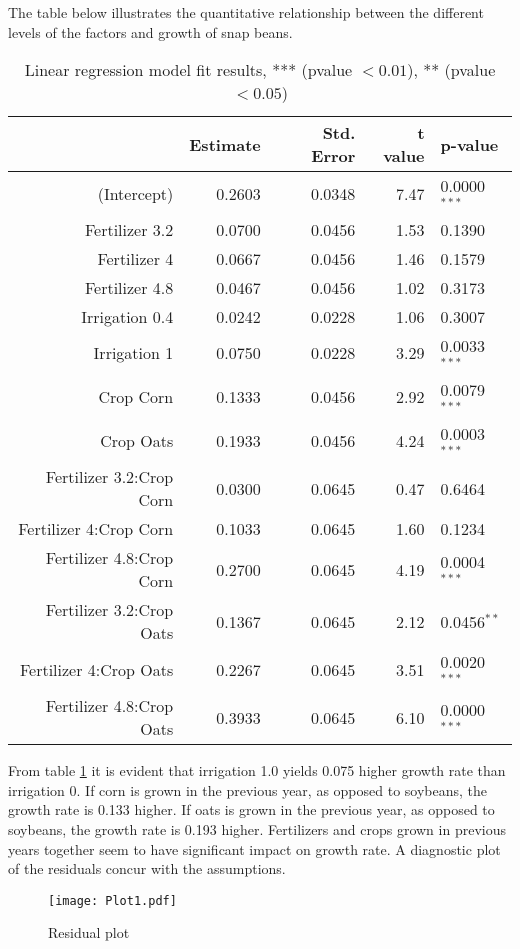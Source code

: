 \documentclass[11pt,a4paper]{article}
\begin{document}
The table below illustrates the quantitative relationship between the different levels of the factors and growth of snap beans. 
\begin{table}[H]
\centering
\begin{tabular}{rrrrl}
  \hline
 & Estimate & Std. Error & t value & p-value \\ 
  \hline
  (Intercept) & 0.2603 & 0.0348 & 7.47 & 0.0000$^{***}$ \\ 
  Fertilizer 3.2 & 0.0700 & 0.0456 & 1.53 & 0.1390 \\ 
  Fertilizer 4 & 0.0667 & 0.0456 & 1.46 & 0.1579 \\ 
  Fertilizer 4.8 & 0.0467 & 0.0456 & 1.02 & 0.3173 \\ 
  Irrigation 0.4 & 0.0242 & 0.0228 & 1.06 & 0.3007 \\ 
  Irrigation 1 & 0.0750 & 0.0228 & 3.29 & 0.0033$^{***}$ \\ 
  Crop Corn & 0.1333 & 0.0456 & 2.92 & 0.0079$^{***}$ \\ 
  Crop Oats & 0.1933 & 0.0456 & 4.24 & 0.0003$^{***}$ \\ 
  Fertilizer 3.2:Crop Corn & 0.0300 & 0.0645 & 0.47 & 0.6464 \\ 
  Fertilizer 4:Crop Corn & 0.1033 & 0.0645 & 1.60 & 0.1234 \\ 
  Fertilizer 4.8:Crop Corn & 0.2700 & 0.0645 & 4.19 & 0.0004$^{***}$ \\ 
  Fertilizer 3.2:Crop Oats & 0.1367 & 0.0645 & 2.12 & 0.0456$^{**}$ \\ 
  Fertilizer 4:Crop Oats & 0.2267 & 0.0645 & 3.51 & 0.0020$^{***}$ \\ 
  Fertilizer 4.8:Crop Oats & 0.3933 & 0.0645 & 6.10 & 0.0000$^{***}$ \\ 
  \hline
\end{tabular}
\caption{Linear regression model fit results, *** (pvalue $< 0.01$), ** (pvalue $< 0.05$)}
\label{tab:Tab1_2}
\end{table}
From table \ref{tab:Tab1_2} it is evident that irrigation 1.0 yields 0.075 higher growth rate than irrigation 0. If corn is grown in the previous year, as opposed to soybeans, the growth rate is 0.133 higher. If oats is grown in the previous year, as opposed to soybeans, the growth rate is 0.193 higher. Fertilizers and crops grown in previous years together seem to have significant impact on growth rate. A diagnostic plot of the residuals concur with the assumptions.
\begin{figure}[H]
\begin{center}
\texttt{[image: Plot1.pdf]}
\end{center}
\caption{Residual plot}
\end{figure}
\end{document}

